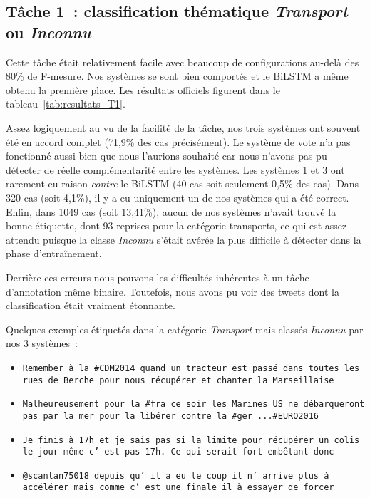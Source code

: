 \label{sec:resultats}

\subsection{Tâche 1~: classification  thématique \emph{Transport} ou \emph{Inconnu}}

Cette tâche était relativement facile avec beaucoup de configurations au-delà des 80\% de F-mesure.
Nos systèmes se sont bien comportés et le BiLSTM a même obtenu la première place.
Les résultats officiels figurent dans le tableau~\ref{tab:resultats_T1}.


Assez logiquement au vu de la facilité de la tâche, nos trois systèmes ont souvent été en accord complet (71,9\% des cas précisément).
Le système de vote n'a pas fonctionné aussi bien que nous l'aurions souhaité car nous n'avons pas pu détecter de réelle complémentarité entre les systèmes.
Les systèmes 1 et 3 ont rarement eu raison \emph{contre} le BiLSTM (40 cas soit seulement 0,5\% des cas).
Dans 320 cas (soit 4,1\%), il y a eu uniquement un de nos systèmes qui a été correct.
Enfin, dans 1049 cas (soit 13,41\%), aucun de nos systèmes n'avait trouvé la bonne étiquette, dont 93 reprises pour la catégorie transports, ce qui est assez attendu puisque la classe \emph{Inconnu} s'était avérée la plus difficile à détecter dans la phase d'entraînement.

Derrière ces erreurs nous pouvons les difficultés inhérentes à un tâche d'annotation même binaire.
Toutefois, nous avons pu voir des tweets dont la classification était vraiment étonnante.

Quelques exemples étiquetés dans la catégorie \emph{Transport} mais classés \emph{Inconnu} par nos 3 systèmes~:
\begin{itemize}
\item \texttt{Remember à la \#CDM2014 quand un tracteur est passé dans toutes les rues de Berche pour nous récupérer et chanter la Marseillaise}
 \item \texttt{Malheureusement pour la \#fra ce soir les Marines US ne débarqueront pas par la mer pour la libérer contre la \#ger ...\#EURO2016}
 \item \texttt{Je finis à 17h et je sais pas si la limite pour récupérer un colis le jour-même c' est pas 17h. Ce qui serait fort embêtant donc}
 \item \texttt{@scanlan75018 depuis qu' il a eu le coup il n' arrive plus à accélérer mais comme c' est une finale il à essayer de forcer}
\end{itemize}

